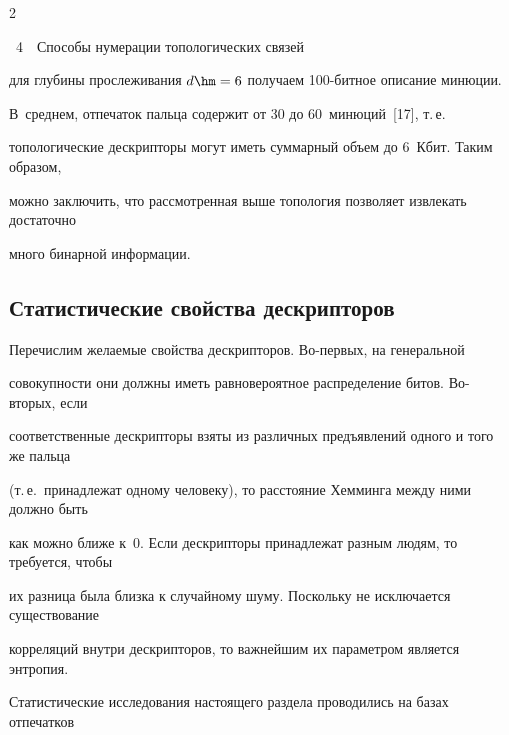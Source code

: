 \begin{multicols}{2}
\begin{center}
\vspace*{9pt}

{{\figurename~4}\ \ \small{Способы нумерации топологических связей}}

\end{center}



\vspace*{6pt}




\addtocounter{figure}{1}





\noindent 

для глубины прослеживания $d \hm= 6$ получаем 100-бит\-ное описание минюции. 

В~среднем, отпечаток пальца содержит от 30 до 60~минюций~[17], т.\,е.\ 

топологические дескрипторы могут иметь суммарный объем до 6~Кбит. Таким образом, 

можно заключить, что рассмотренная выше топология позволяет извлекать достаточно 

много бинарной информации. 



\subsection{Статистические свойства дескрипторов}



      Перечислим желаемые свойства дескрипторов. Во-пер\-вых, на генеральной 

совокупности они должны иметь равновероятное распределение битов. Во-вто\-рых, если 

соответственные дескрипторы взяты из различных предъявлений одного и того же пальца 

(т.\,е.\ принадлежат одному человеку), то расстояние Хемминга между ними должно быть 

как можно ближе к~0. Если дескрипторы принадлежат разным людям, то требуется, чтобы 

их разница была близка к случайному шуму. Поскольку не исключается существование 

корреляций внутри дескрипторов, то важнейшим их параметром является энтропия. 

Статистические исследования настоящего раздела проводились на базах отпечатков 


\end{multicols}
